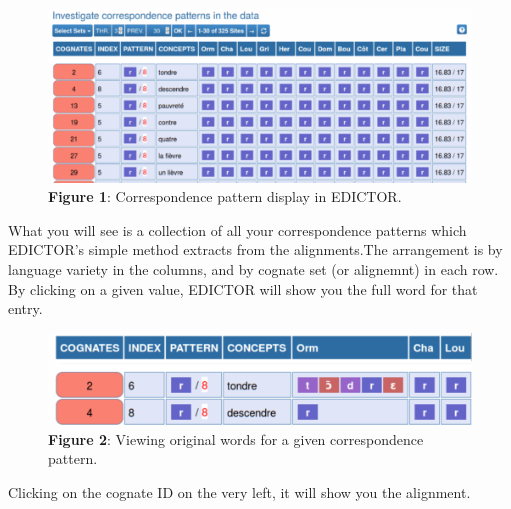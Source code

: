 \documentclass[
  a4paper,
  14pt,
  oneside,
  tablecaptionabove
]{scrbook}
\begin{document}
\begin{figure}[htb]
\centering
\includegraphics[width=\textwidth]{images/__f.hypotheses.org_wp-content_blogs.dir_4500_files_2019_02_edictor1-500x206.png}
\captionsetup{justification=centering}
\caption*{\small \textbf{Figure 1}: Correspondence pattern display in EDICTOR.}
\end{figure}

What you will see is a collection of all your correspondence patterns
which EDICTOR's simple method extracts from the alignments.The
arrangement is by language variety in the columns, and by cognate set
(or alignemnt) in each row. By clicking on a given value, EDICTOR will
show you the full word for that entry.

\begin{figure}[htb]
\centering
\includegraphics[width=\textwidth]{images/__f.hypotheses.org_wp-content_blogs.dir_4500_files_2019_02_edictor2-500x109.png}
\captionsetup{justification=centering}
\caption*{\small \textbf{Figure 2}: Viewing original words for a given correspondence pattern.}
\end{figure}


Clicking on the cognate ID on the very left, it will show you the
alignment.
\end{document}
